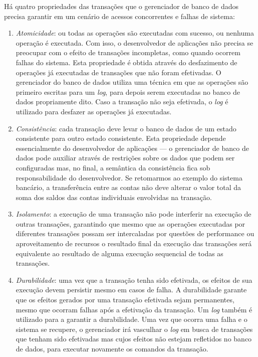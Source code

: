 \documentclass[11pt,twoside,a4paper]{book}
\begin{document}
Há quatro propriedades das transações que o gerenciador de banco de dados precisa garantir em um cenário de acessos concorrentes e falhas de sistema:
\begin{enumerate}
\item \emph{Atomicidade}: ou todas as operações são executadas com sucesso, ou nenhuma operação é executada. Com isso, o desenvolvedor de aplicações não precisa se preocupar com o efeito de transações incompletas, como quando ocorrem falhas do sistema. Esta propriedade é obtida através do desfazimento de operações já executadas de transações que não foram efetivadas. O gerenciador do banco de dados utiliza uma técnica em que as operações são primeiro escritas para um \emph{log}, para depois serem executadas no banco de dados propriamente dito. Caso a transação não seja efetivada, o \emph{log} é utilizado para desfazer as operações já executadas.
\item \emph{Consistência}: cada transação deve levar o banco de dados de um estado consistente para outro estado consistente. Esta propriedade depende essencialmente do desenvolvedor de aplicações --- o gerenciador de banco de dados pode auxiliar através de restrições sobre os dados que podem ser configuradas mas, no final, a semântica da consistência fica sob responsabilidade do desenvolvedor. Se retomarmos ao exemplo do sistema bancário, a transferência entre as contas não deve alterar o valor total da soma dos saldos das contas individuais envolvidas na transação.
\item \emph{Isolamento}: a execução de uma transação não pode interferir na execução de outras transações, garantindo que mesmo que as operações executadas por diferentes transações possam ser intercaladas por questões de performance ou aproveitamento de recursos o resultado final da execução das transações será equivalente ao resultado de alguma execução sequencial de todas as transações.
\item \emph{Durabilidade}: uma vez que a transação tenha sido efetivada, os efeitos de sua execução devem persistir mesmo em casos de falha. A durabilidade garante que os efeitos gerados por uma transação efetivada sejam permanentes, mesmo que ocorram falhas após a efetivação da transação. Um \emph{log} também é utilizado para a garantir a durabilidade. Uma vez que ocorra uma falha e o sistema se recupere, o gerenciador irá vasculhar o \emph{log} em busca de transações que tenham sido efetivadas mas cujos efeitos não estejam refletidos no banco de dados, para executar novamente os comandos da transação.
\end{enumerate}
\end{document}
